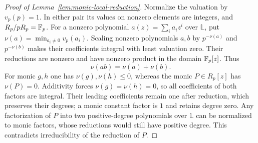 \begin{proof}[Proof of Lemma~\ref{lem:monic-local-reduction}]
Normalize the valuation by $v_p(p)=1$.  In either pair its values on
nonzero elements are integers, and $R_p/pR_p=\mathbb F_p$.  For a nonzero
polynomial $a(z)=\sum_i a_i z^i$ over $\mathbb L$, put
$\nu(a)=\min_{a_i\ne0}v_p(a_i)$.  Scaling nonzero polynomials $a,b$ by
$p^{-\nu(a)}$ and $p^{-\nu(b)}$ makes their coefficients integral with
least valuation zero.  Their reductions are nonzero and have nonzero
product in the domain $\mathbb F_p[z]$.  Thus
\[
 \nu(ab)=\nu(a)+\nu(b).
\]
For monic $g,h$ one has $\nu(g),\nu(h)\leq0$, whereas the monic
$P\in R_p[z]$ has $\nu(P)=0$.  Additivity forces
$\nu(g)=\nu(h)=0$, so all coefficients of both factors are integral.
Their leading coefficients remain one after reduction, which preserves
their degrees; a monic constant factor is $1$ and retains degree zero.
Any factorization of $P$ into two positive-degree polynomials over
$\mathbb L$ can be normalized to monic factors, whose reductions would
still have positive degree.  This contradicts irreducibility of the
reduction of $P$.
\end{proof}


